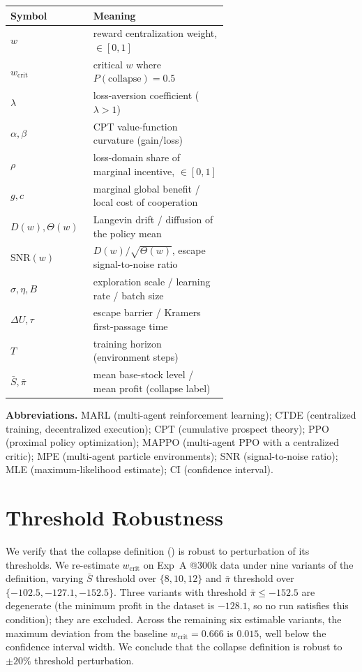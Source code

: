 \documentclass[letterpaper]{article}
\theoremstyle{plain}
\newcommand{\wcrit}{w_{\mathrm{crit}}}
\begin{document}
\begin{table}[h]
\centering
\small
\begin{tabular}{lp{0.62\linewidth}}
\toprule
Symbol & Meaning \\
\midrule
$w$ & reward centralization weight, $\in[0,1]$ \\
$\wcrit$ & critical $w$ where $P(\mathrm{collapse}){=}0.5$ \\
$\lambda$ & loss-aversion coefficient ($\lambda{>}1$) \\
$\alpha,\beta$ & CPT value-function curvature (gain/loss) \\
$\rho$ & loss-domain share of marginal incentive, $\in[0,1]$ \\
$g,c$ & marginal global benefit / local cost of cooperation \\
$D(w),\Theta(w)$ & Langevin drift / diffusion of the policy mean \\
$\mathrm{SNR}(w)$ & $D(w)/\sqrt{\Theta(w)}$, escape signal-to-noise ratio \\
$\sigma,\eta,B$ & exploration scale / learning rate / batch size \\
$\Delta U,\tau$ & escape barrier / Kramers first-passage time \\
$T$ & training horizon (environment steps) \\
$\bar S,\bar\pi$ & mean base-stock level / mean profit (collapse label) \\
\bottomrule
\end{tabular}
\end{table}

\noindent\textbf{Abbreviations.} MARL (multi-agent reinforcement learning);
CTDE (centralized training, decentralized execution); CPT (cumulative prospect
theory); PPO (proximal policy optimization); MAPPO (multi-agent PPO with a
centralized critic); MPE (multi-agent particle environments); SNR
(signal-to-noise ratio); MLE (maximum-likelihood estimate);
CI (confidence interval).

\section{Threshold Robustness}
\label{sec:appendix_robustness}

We verify that the collapse definition () is robust to
perturbation of its thresholds.
We re-estimate $\wcrit$ on Exp~A @300k data under nine variants of the
definition, varying $\bar{S}$ threshold over $\{8, 10, 12\}$ and
$\bar{\pi}$ threshold over $\{-102.5, -127.1, -152.5\}$.
Three variants with threshold $\bar{\pi} \leq -152.5$ are degenerate
(the minimum profit in the dataset is $-128.1$, so no run satisfies
this condition); they are excluded.
Across the remaining six estimable variants, the maximum deviation from
the baseline $\wcrit = 0.666$ is $0.015$, well below the confidence
interval width.
We conclude that the collapse definition is robust to $\pm 20\%$ threshold
perturbation.
\end{document}
